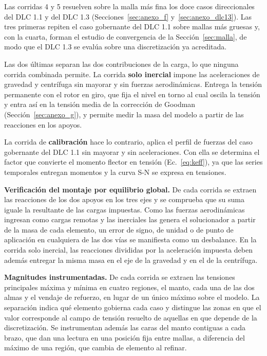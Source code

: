 Las corridas 4 y 5 resuelven sobre la malla más fina los doce casos direccionales del DLC 1.1 y del DLC 1.3 (Secciones~\ref{sec:anexo_f} y~\ref{sec:anexo_dlc13}). Las tres primeras repiten el caso gobernante del DLC 1.1 sobre mallas más gruesas y, con la cuarta, forman el estudio de convergencia de la Sección~\ref{sec:malla}, de modo que el DLC 1.3 se evalúa sobre una discretización ya acreditada.

Las dos últimas separan las dos contribuciones de la carga, lo que ninguna corrida combinada permite. La corrida \textbf{solo inercial} impone las aceleraciones de gravedad y centrífuga sin mayorar y sin fuerzas aerodinámicas. Entrega la tensión permanente con el rotor en giro, que fija el nivel en torno al cual oscila la tensión y entra así en la tensión media de la corrección de Goodman (Sección~\ref{sec:anexo_g}), y permite medir la masa del modelo a partir de las reacciones en los apoyos.

La corrida de \textbf{calibración} hace lo contrario, aplica el perfil de fuerzas del caso gobernante del DLC 1.1 sin mayorar y sin aceleraciones. Con ella se determina el factor que convierte el momento flector en tensión (Ec.~\ref{eq:keff}), ya que las series temporales entregan momentos y la curva S-N se expresa en tensiones.

\medskip
\noindent\textbf{Verificación del montaje por equilibrio global.}
De cada corrida se extraen las reacciones de los dos apoyos en los tres ejes y se comprueba que su suma iguale la resultante de las cargas impuestas. Como las fuerzas aerodinámicas ingresan como cargas remotas y las inerciales las genera el solucionador a partir de la masa de cada elemento, un error de signo, de unidad o de punto de aplicación en cualquiera de las dos vías se manifiesta como un desbalance. En la corrida solo inercial, las reacciones divididas por la aceleración impuesta deben además entregar la misma masa en el eje de la gravedad y en el de la centrífuga.

\medskip
\noindent\textbf{Magnitudes instrumentadas.}
De cada corrida se extraen las tensiones principales máxima y mínima en cuatro regiones, el manto, cada una de las dos almas y el vendaje de refuerzo, en lugar de un único máximo sobre el modelo. La separación indica qué elemento gobierna cada caso y distingue las zonas en que el valor corresponde al campo de tensión resuelto de aquellas en que depende de la discretización. Se instrumentan además las caras del manto contiguas a cada brazo, que dan una lectura en una posición fija entre mallas, a diferencia del máximo de una región, que cambia de elemento al refinar.


